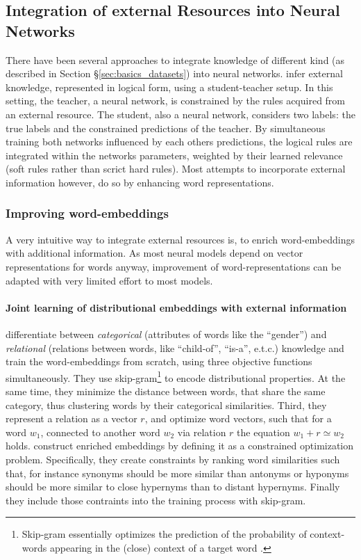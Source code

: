 \subsection{Integration of external Resources into Neural Networks}\label{sec:ext_res_in_nn}
There have been several approaches to integrate knowledge of different kind (as described in Section §\ref{sec:basics_datasets}) into neural networks. \cite{hu2016deep} infer external knowledge, represented in logical form, using a student-teacher setup. In this setting, the teacher, a neural network, is constrained by the rules acquired from an external resource. The student, also a neural network, considers two labels: the true labels and the constrained predictions of the teacher. By simultaneous training both networks influenced by each others predictions, the logical rules are integrated within the networks parameters, weighted by their learned relevance (soft rules rather than scrict hard rules). Most attempts to incorporate external information however, do so by enhancing word representations.
\subsubsection{Improving word-embeddings}\label{sec:embeddings_improvements_relwork}
A very intuitive way to integrate external resources is, to enrich word-embeddings with additional information. As most neural models depend on vector representations for words anyway, improvement of word-representations can be adapted with very limited effort to most models.

\paragraph*{Joint learning of distributional embeddings with external information}
\cite{xu2014rc} differentiate between \textit{categorical} (attributes of words like the ``gender'') and \textit{relational} (relations between words, like ``child-of'', ``is-a'', e.t.c.) knowledge and train the word-embeddings from scratch, using three objective functions simultaneously. They use skip-gram\footnote{Skip-gram essentially optimizes the prediction of the probability of context-words appearing in the (close) context of a target word \citep{goldberg2014word2vec}.} to encode distributional properties. At the same time, they minimize the distance between words, that share the same category, thus clustering words by their categorical similarities. Third, they represent a relation as a vector $r$,  and optimize word vectors, such that for a word $w_1$, connected to another word $w_2$ via relation $r$ the equation $w_1 + r \simeq w_2$ holds. \cite{liu2015learning} construct enriched embeddings by defining it as a constrained optimization problem. Specifically, they create constraints by ranking word similarities such that, for instance synonyms should be more similar than antonyms or hyponyms should be more similar to close hypernyms than to distant hypernyms. Finally they include those contraints into the training process with skip-gram. 
